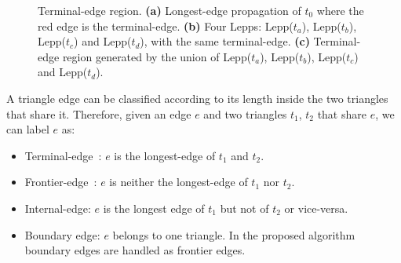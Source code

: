 \documentclass[lineno,pdflatex,sn-mathphys]{sn-jnl}%
\theoremstyle{thmstyleone}%
\theoremstyle{thmstyletwo}%
\theoremstyle{thmstylethree}%
\begin{document}
\begin{figure}[h]
\centering     %
{} 
\caption{Terminal-edge region. \textbf{(a)} Longest-edge propagation of $t_0$ where the red edge is the terminal-edge. \textbf{(b)} Four Lepps: Lepp($t_a$), Lepp($t_b$), Lepp($t_c$) and Lepp($t_d$), with the same terminal-edge. \textbf{(c)} Terminal-edge region generated by the union of Lepp($t_a$), Lepp($t_b$), Lepp($t_c$) and Lepp($t_d$).}
\label{fig:leppexample} 
\end{figure}

\noindent
A triangle edge can be classified according to its  length inside the two triangles that share it. Therefore, given an edge $e$ and two triangles $t_1$, $t_2$ that share $e$, we can label  $e$ as: 

\begin{itemize}
    \item Terminal-edge~\cite{Rivara97}: $e$ is the longest-edge of $t_1$ and $t_2$.
    \item Frontier-edge~\cite{Ascom209}: $e$ is neither the longest-edge of $t_1$ nor $t_2$. 
    \item Internal-edge:  $e$ is the longest edge of $t_1$ but not of $t_2$ or vice-versa.
    \item Boundary edge: $e$ belongs to one triangle. In the proposed algorithm boundary edges are handled as frontier edges.
\end{itemize}
\end{document}
